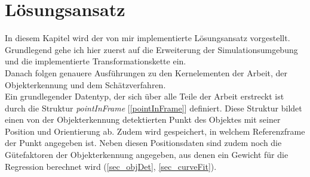 \section{Lösungsansatz}
In diesem Kapitel wird der von mir implementierte Lösungsansatz vorgestellt. Grundlegend gehe ich hier zuerst auf die Erweiterung der Simulationsumgebung und die implementierte Transformationskette ein.\\
Danach folgen genauere Ausführungen zu den Kernelementen der Arbeit, der Objekterkennung und dem Schätzverfahren.\\

Ein grundlegender Datentyp, der sich über alle Teile der Arbeit erstreckt ist durch die Struktur \textit{pointInFrame} [\ref{pointInFrame}] definiert. Diese Struktur bildet einen von der Objekterkennung detektierten Punkt des Objektes mit seiner Position und Orientierung ab. Zudem wird gespeichert, in welchem Referenzframe der Punkt angegeben ist. Neben diesen Positionsdaten sind zudem noch die Gütefaktoren der Objekterkennung angegeben, aus denen ein Gewicht für die Regression berechnet wird (\ref{sec_objDet}, \ref{sec_curveFit}).

\begin{lstlisting}[language=Matlab]

\end{lstlisting}
